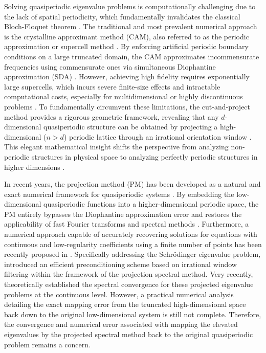 \documentclass[11pt]{article}
\numberwithin{equation}{section}
\begin{document}
Solving quasiperiodic eigenvalue problems is computationally challenging due to the lack of spatial periodicity, which fundamentally invalidates the classical Bloch-Floquet theorem \cite{simon1982almost}. The traditional and most prevalent numerical approach is the crystalline approximant method (CAM), also referred to as the periodic approximation or supercell method \cite{goldman1993quasicrystals, tsunetsugu1991electronic}. By enforcing artificial periodic boundary conditions on a large truncated domain, the CAM approximates incommensurate frequencies using commensurate ones via simultaneous Diophantine approximation (SDA) \cite{davenport1946simultaneous, jiang2025approximation}. However, achieving high fidelity requires exponentially large supercells, which incurs severe finite-size effects and intractable computational costs, especially for multidimensional or highly discontinuous problems \cite{steurer2009crystallography}. To fundamentally circumvent these limitations, the cut-and-project method provides a rigorous geometric framework, revealing that any $d$-dimensional quasiperiodic structure can be obtained by projecting a high-dimensional ($n>d$) periodic lattice through an irrational orientation window \cite{de1981algebraic, duneau1985quasiperiodic}. This elegant mathematical insight shifts the perspective from analyzing non-periodic structures in physical space to analyzing perfectly periodic structures in higher dimensions \cite{avila2009ten}.

In recent years, the projection method (PM) has been developed as a natural and exact numerical framework for quasiperiodic systems \cite{jiang2014numerical}. By embedding the low-dimensional quasiperiodic functions into a higher-dimensional periodic space, the PM entirely bypasses the Diophantine approximation error and restores the applicability of fast Fourier transforms and spectral methods \cite{jiang2014numerical, jiang2024numerical, jiang2025projection}. Furthermore, a numerical approach capable of accurately recovering solutions for equations with continuous and low-regularity coefficients using a finite number of points has been recently proposed in \cite{jiang2024accurately}. Specifically addressing the Schr{\"o}dinger eigenvalue problem, \cite{jiang2025irrational} introduced an efficient preconditioning scheme based on irrational window filtering within the framework of the projection spectral method. Very recently, \cite{jiang2026quasiperiodic} theoretically established the spectral convergence for these projected eigenvalue problems at the continuous level. However, a practical numerical analysis detailing the exact mapping error from the truncated high-dimensional space back down to the original low-dimensional system is still not complete. Therefore, the convergence and numerical error associated with mapping the elevated eigenvalues by the projected spectral method back to the original quasiperiodic problem remains a concern.
\end{document}

